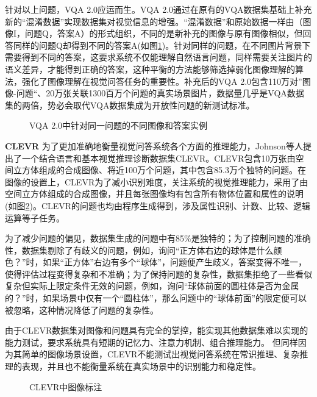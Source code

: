 针对以上问题，VQA 2.0应运而生。VQA 2.0通过在原有的VQA数据集基础上补充新的“混淆数据”实现数据集对视觉信息的增强。“混淆数据”和原始数据一样由（图像I，问题Q，答案A）的形式组织，不同的是新补充的图像与原有图像相似，但回答同样的问题Q却得到不同的答案A(如图\ref{vqa2})。针对同样的问题，在不同图片背景下需要得到不同的答案，这要求系统不仅能理解自然语言问题，同样需要关注图片的语义差异，才能得到正确的答案，这种平衡的方法能够筛选掉弱化图像理解的算法，强化了图像理解在视觉问答任务的重要性。补充后的VQA 2.0包含110万对”图像-问题“、20万张关联1300百万个问题的真实场景图片，数据量几乎是VQA数据集的两倍，势必会取代VQA数据集成为开放性问题的新测试标准。
\begin{figure}[H]
	\centering
	\caption{VQA 2.0中针对同一问题的不同图像和答案实例}
	\label{vqa2}
\end{figure}

\textbf{CLEVR}
为了更加准确地衡量视觉问答系统各个方面的推理能力，Johnson等人提出了一个结合语言和基本视觉推理诊断数据集CLEVR。CLEVR包含10万张由空间立方体组成的合成图像、将近100万个问题，其中包含85.3万个独特的问题。在图像的设置上，CLEVR为了减小识别难度，关注系统的视觉推理能力，采用了由空间立方体组成的合成图像，并且每张图像均有包含所有物体位置和属性的说明(如图\ref{clevr})。CLEVR的问题也均由程序生成得到，涉及属性识别、计数、比较、逻辑运算等子任务。

为了减少问题的偏见，数据集生成的问题中有85\%是独特的；为了控制问题的准确性，数据集剔除了有歧义的问题，例如，询问“正方体右边的球体是什么颜色？”时，如果“正方体”右边有多个“球体”，问题便产生歧义，答案变得不唯一，使得评估过程变得复杂和不准确；为了保持问题的复杂性，数据集拒绝了一些看似复杂但实际上限定条件无效的问题，例如，询问“球体前面的圆柱体是否为金属的？”时，如果场景中仅有一个“圆柱体”，那么问题中的“球体前面”的限定便可以被忽略，这种情况降低了问题的复杂性。

由于CLEVR数据集对图像和问题具有完全的掌控，能实现其他数据集难以实现的能力测试，要求系统具有短期的记忆力、注意力机制、组合推理能力。
但同样因为其简单的图像场景设置，CLEVR不能测试出视觉问答系统在常识推理、复杂推理的表现，并且也不能衡量系统在真实场景中的识别能力和稳定性。
\begin{figure}[H]
	\centering
	\caption{CLEVR中图像标注}
	\label{clevr}
\end{figure}

